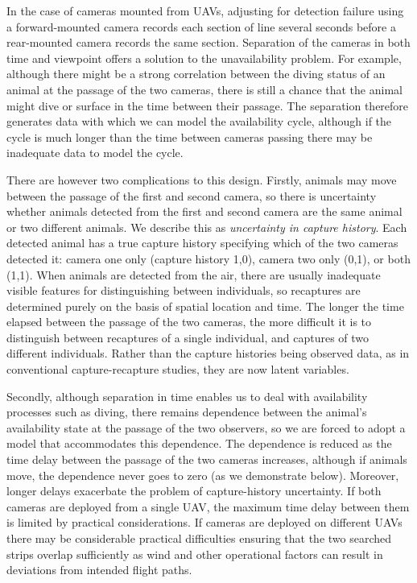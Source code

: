 \documentclass[useAMS, usenatbib, referee]{biom}\usepackage[]{graphicx}\usepackage[]{color}
\begin{document}
In the case of cameras mounted from UAVs, adjusting for detection failure using a forward-mounted camera records each section of line several seconds before a rear-mounted camera records the same section. Separation of the cameras in both time and viewpoint offers a solution to the unavailability problem. For example, although there might be a strong correlation between the diving status of an animal at the passage of the two cameras, there is still a chance that the animal might dive or surface in the time between their passage. The separation therefore generates data with which we can model the availability cycle, although if the cycle is much longer than the time between cameras passing there may be inadequate data to model the cycle.

There are however two complications to this design. Firstly, animals may move between the passage of the first and second camera, so there is uncertainty whether animals detected from the first and second camera are the same animal or two different animals. We describe this as {\em uncertainty in capture history}. Each detected animal has a true capture history specifying which of the two cameras detected it: camera one only (capture history 1,0), camera two only (0,1), or both (1,1). When animals are detected from the air, there are usually inadequate visible features for distinguishing between individuals, so recaptures are determined purely on the basis of spatial location and time. The longer the time elapsed between the passage of the two cameras, the more difficult it is to distinguish between recaptures of a single individual, and captures of two different individuals. Rather than the capture histories being observed data, as in conventional capture-recapture studies, they are now latent variables.

Secondly, although separation in time enables us to deal with availability processes such as diving, there remains dependence between the animal's availability state at the passage of the two observers, so we are forced to adopt a model that accommodates this dependence. The dependence is reduced as the time delay between the passage of the two cameras increases, although if animals move, the dependence never goes to zero (as we demonstrate below). Moreover, longer delays exacerbate the problem of capture-history uncertainty. If both cameras are deployed from a single UAV, the maximum time delay between them is limited by practical considerations. If cameras are deployed on different UAVs there may be considerable practical difficulties ensuring that the two searched strips overlap sufficiently as wind and other operational factors can result in deviations from intended flight paths.
\end{document}
